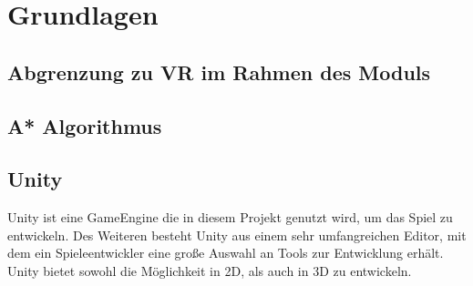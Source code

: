 \chapter{Grundlagen}
\section{Abgrenzung zu VR im Rahmen des Moduls}
\section{A* Algorithmus}
\label{sec:fundamentals}
\section{Unity}
Unity ist eine GameEngine die in diesem Projekt genutzt wird, um das Spiel zu entwickeln. Des Weiteren besteht Unity aus einem sehr umfangreichen Editor, mit dem ein Spieleentwickler eine große Auswahl an Tools zur Entwicklung erh\"alt. Unity bietet sowohl die M\"oglichkeit in 2D, als auch in 3D zu entwickeln.
